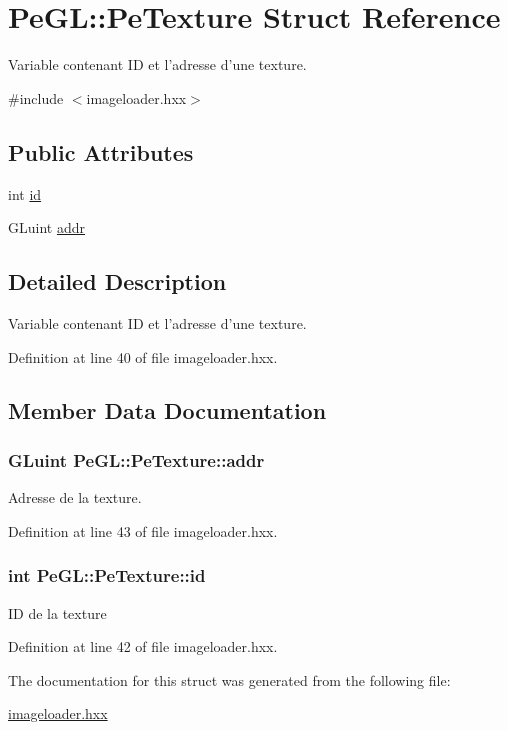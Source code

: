 \hypertarget{structPeGL_1_1PeTexture}{\section{Pe\-G\-L\-:\-:Pe\-Texture Struct Reference}
\label{structPeGL_1_1PeTexture}
}


Variable contenant I\-D et l'adresse d'une texture.  




{\ttfamily \#include $<$imageloader.\-hxx$>$}

\subsection*{Public Attributes}
\begin{DoxyCompactItemize}
\item 
int \hyperlink{structPeGL_1_1PeTexture_a7295aa38a0fb0db3a6a77c592fb3e868}{id}
\item 
G\-Luint \hyperlink{structPeGL_1_1PeTexture_a09f655f6deb304d201dd2b894cabe0f3}{addr}
\end{DoxyCompactItemize}


\subsection{Detailed Description}
Variable contenant I\-D et l'adresse d'une texture. 

Definition at line 40 of file imageloader.\-hxx.



\subsection{Member Data Documentation}
\hypertarget{structPeGL_1_1PeTexture_a09f655f6deb304d201dd2b894cabe0f3}{
\subsubsection[{addr}]{\setlength{\rightskip}{0pt plus 5cm}G\-Luint Pe\-G\-L\-::\-Pe\-Texture\-::addr}}\label{structPeGL_1_1PeTexture_a09f655f6deb304d201dd2b894cabe0f3}
Adresse de la texture. 

Definition at line 43 of file imageloader.\-hxx.

\hypertarget{structPeGL_1_1PeTexture_a7295aa38a0fb0db3a6a77c592fb3e868}{
\subsubsection[{id}]{\setlength{\rightskip}{0pt plus 5cm}int Pe\-G\-L\-::\-Pe\-Texture\-::id}}\label{structPeGL_1_1PeTexture_a7295aa38a0fb0db3a6a77c592fb3e868}
I\-D de la texture 

Definition at line 42 of file imageloader.\-hxx.



The documentation for this struct was generated from the following file\-:\begin{DoxyCompactItemize}
\item 
\hyperlink{imageloader_8hxx}{imageloader.\-hxx}\end{DoxyCompactItemize}
